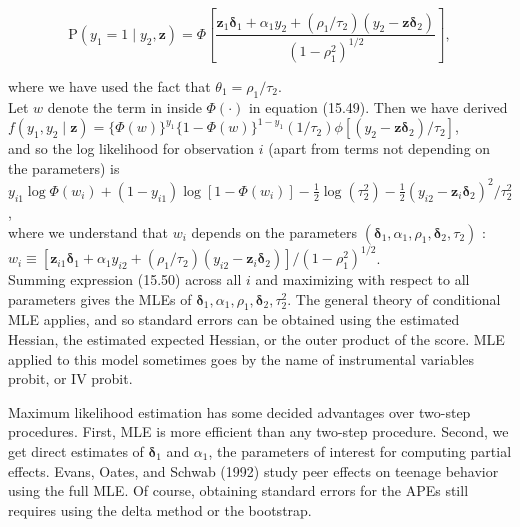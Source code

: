 \documentclass[10pt]{article}
\begin{document}
\begin{equation*}
\mathrm{P}\left(y_{1}=1 \mid y_{2}, \mathbf{z}\right)=\Phi\left[\frac{\mathbf{z}_{1} \boldsymbol{\delta}_{1}+\alpha_{1} y_{2}+\left(\rho_{1} / \tau_{2}\right)\left(y_{2}-\mathbf{z} \boldsymbol{\delta}_{2}\right)}{\left(1-\rho_{1}^{2}\right)^{1 / 2}}\right], \tag{15.49}
\end{equation*}


where we have used the fact that $\theta_{1}=\rho_{1} / \tau_{2}$.\\
Let $w$ denote the term in inside $\Phi(\cdot)$ in equation (15.49). Then we have derived\\
$f\left(y_{1}, y_{2} \mid \mathbf{z}\right)=\{\Phi(w)\}^{y_{1}}\{1-\Phi(w)\}^{1-y_{1}}\left(1 / \tau_{2}\right) \phi\left[\left(y_{2}-\mathbf{z} \boldsymbol{\delta}_{2}\right) / \tau_{2}\right]$,\\
and so the log likelihood for observation $i$ (apart from terms not depending on the parameters) is\\
$y_{i 1} \log \Phi\left(w_{i}\right)+\left(1-y_{i 1}\right) \log \left[1-\Phi\left(w_{i}\right)\right]-\frac{1}{2} \log \left(\tau_{2}^{2}\right)-\frac{1}{2}\left(y_{i 2}-\mathbf{z}_{i} \boldsymbol{\delta}_{2}\right)^{2} / \tau_{2}^{2}$,\\
where we understand that $w_{i}$ depends on the parameters $\left(\boldsymbol{\delta}_{1}, \alpha_{1}, \rho_{1}, \boldsymbol{\delta}_{2}, \tau_{2}\right)$ :\\
$w_{i} \equiv\left[\mathbf{z}_{i 1} \boldsymbol{\delta}_{1}+\alpha_{1} y_{i 2}+\left(\rho_{1} / \tau_{2}\right)\left(y_{i 2}-\mathbf{z}_{i} \boldsymbol{\delta}_{2}\right)\right] /\left(1-\rho_{1}^{2}\right)^{1 / 2}$.\\
Summing expression (15.50) across all $i$ and maximizing with respect to all parameters gives the MLEs of $\boldsymbol{\delta}_{1}, \alpha_{1}, \rho_{1}, \boldsymbol{\delta}_{2}, \tau_{2}^{2}$. The general theory of conditional MLE applies, and so standard errors can be obtained using the estimated Hessian, the estimated expected Hessian, or the outer product of the score. MLE applied to this model sometimes goes by the name of instrumental variables probit, or IV probit.

Maximum likelihood estimation has some decided advantages over two-step procedures. First, MLE is more efficient than any two-step procedure. Second, we get direct estimates of $\boldsymbol{\delta}_{1}$ and $\alpha_{1}$, the parameters of interest for computing partial effects. Evans, Oates, and Schwab (1992) study peer effects on teenage behavior using the full MLE. Of course, obtaining standard errors for the APEs still requires using the delta method or the bootstrap.
\end{document}
